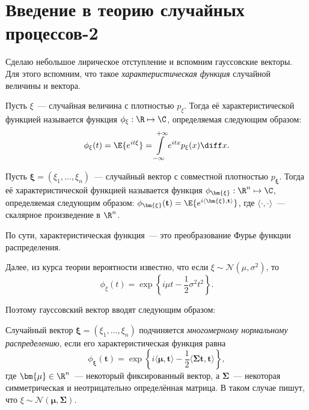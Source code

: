 \section{Введение в теорию случайных процессов-2}
Сделаю небольшое лирическое отступление и вспомним гауссовские векторы. Для 
этого вспомним, что такое \emph{характеристическая функция} случайной величины 
и вектора.
\begin{definition}
    Пусть \(\xi\)~--- случайная величина с плотностью \(p_{\xi}\). Тогда её 
    характеристической функцией называется функция \(\phi_{\xi} : \R \mapsto 
    \C\), определяемая следующим образом:
    \[
        \phi_{\xi}(t) = \E{e^{it\xi}} = \int\limits_{-\infty}^{+\infty} 
        e^{itx}p_{\xi}(x)\diff x.
    \]
\end{definition}
\begin{definition}
    Пусть \(\bm{\xi} = (\xi_{1}, \dots, \xi_{n})\)~--- случайный вектор с 
    совместной плотностью \(p_{\bm{\xi}}\). Тогда её характеристической 
    функцией называется функция \(\phi_{\bm{\xi}} : \R^{n} \mapsto \C\), 
    определяемая следующим образом: \(\phi_{\bm{\xi}}(\mathbf{t}) = 
    \E{e^{i\langle\bm{\xi}, \mathbf{t}\rangle}}\), где \(\langle\cdot, 
    \cdot\rangle\)~--- скалярное произведение в \(\R^{n}\).
\end{definition}

По сути, характеристическая функция~--- это преобразование Фурье функции 
распределения.

Далее, из курса теории вероятности известно, что если \(\xi \sim 
\mathcal{N}(\mu, \sigma^{2})\), то
\[
    \phi_{\xi}(t) = \exp\left\{i \mu t - \frac{1}{2}\sigma^{2}t^{2}\right\}.
\]

Поэтому гауссовский вектор вводят следующим образом:
\begin{definition}
    Случайный вектор \(\bm{\xi} = (\xi_{1}, \dots, \xi_{n})\) подчиняется 
    \emph{многомерному нормальному распределению}, если его характеристическая 
    функция равна
    \[
        \phi_{\bm{\xi}}(\mathbf{t}) = \exp\left\{i\langle\bm{\mu}, 
        \mathbf{t}\rangle - \frac{1}{2}\langle\mathbf{\Sigma t}, 
        \mathbf{t}\rangle\right\},
    \]
    где \(\bm{\mu} \in \R^{n}\)~--- некоторый фиксированный вектор, а 
    \(\mathbf{\Sigma}\)~--- некоторая симметрическая и неотрицательно 
    определённая матрица. В таком случае пишут, что \(\xi \sim 
    \mathcal{N}(\bm{\mu}, \mathbf{\Sigma})\).
\end{definition}